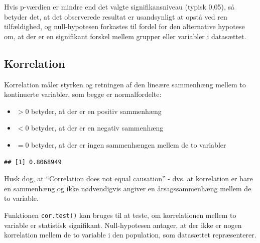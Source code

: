\documentclass[
]{book}
\newenvironment{Shaded}{\begin{snugshade}}{\end{snugshade}}
\newcommand{\FunctionTok}[1]{\textcolor[rgb]{0.13,0.29,0.53}{\textbf{#1}}}
\newcommand{\NormalTok}[1]{#1}
\newcommand{\SpecialCharTok}[1]{\textcolor[rgb]{0.81,0.36,0.00}{\textbf{#1}}}
\providecommand{\tightlist}{%
  \setlength{\itemsep}{0pt}\setlength{\parskip}{0pt}}
\theoremstyle{definition}
\theoremstyle{definition}
\theoremstyle{definition}
\theoremstyle{definition}
\theoremstyle{remark}
\begin{document}
Hvis p-værdien er mindre end det valgte signifikansniveau (typisk 0,05), så betyder det, at det observerede resultat er usandsynligt at opstå ved ren tilfældighed, og null-hypotesen forkastes til fordel for den alternative hypotese om, at der er en signifikant forskel mellem grupper eller variabler i datasættet.

\subsection{Korrelation}\label{korrelation}

Korrelation måler styrken og retningen af den lineære sammenhæng mellem to kontinuerte variabler, som begge er normalfordelte:

\begin{itemize}
\tightlist
\item
  \(>0\) betyder, at der er en positiv sammenhæng
\item
  \(<0\) betyder, at der er en negativ sammenhæng
\item
  \(=0\) betyder, at der er ingen sammenhængen mellem de to variabler
\end{itemize}

\begin{Shaded}
\end{Shaded}

\begin{verbatim}
## [1] 0.8068949
\end{verbatim}

Husk dog, at ``Correlation does not equal causation'' - dvs. at korrelation er bare en sammenhæng og ikke nødvendigvis angiver en årsagssammenhæng mellem de to variable.

Funktionen \texttt{cor.test()} kan bruges til at teste, om korrelationen mellem to variable er statistisk signifikant. Null-hypotesen antager, at der ikke er nogen korrelation mellem de to variable i den population, som datasættet repræsenterer.

\begin{Shaded}
\end{Shaded}
\end{document}
